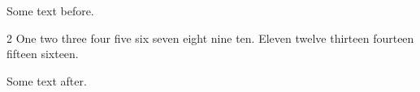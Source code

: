 \documentclass{article}
\begin{document}
Some text before.
\begin{multicols}{2}
One two three four five six seven eight nine ten.
Eleven twelve thirteen fourteen fifteen sixteen.
\end{multicols}
Some text after.
\end{document}
